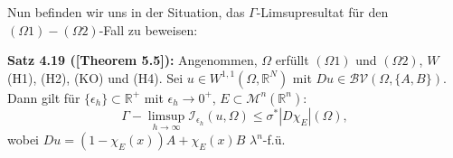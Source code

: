 Nun befinden wir uns in der Situation, das \(\Gamma\)-Limsupresultat für den \((\Omega1)-(\Omega2)\)-Fall zu beweisen:\\[0.5cm]
\colorbox{generalYellow}{\begin{minipage}{16cm}{\textcolor{black}{}{\label{theo4.19}}}
\textbf{Satz 4.19 (\cite{ContiTwoGradientPhase}[Theorem 5.5]):} Angenommen, \(\Omega\) erfüllt \((\Omega1)\) und \((\Omega2)\), \(W\) (H1), (H2), (KO) und (H4). Sei \(u \in W^{1,1}(\Omega,\mathbb{R}^N)\) mit \(Du \in \mathcal{BV}(\Omega,\{A,B\})\). Dann gilt für \(\{\epsilon_h\} \subset \mathbb{R}^+\) mit \(\epsilon_h \to 0^+\), \(E \subset \mathcal{M}^n(\mathbb{R}^n)\):
\begin{equation}
    \Gamma-\limsup_{h \to \infty} \mathcal{I}_{\epsilon_h} (u,\Omega) \leq \sigma^* |D \chi_E| (\Omega),
\end{equation}
wobei \(Du = (1 - \chi_E(x))A + \chi_E (x) B\) \(\lambda^n\)-f.ü.
\end{minipage}}

